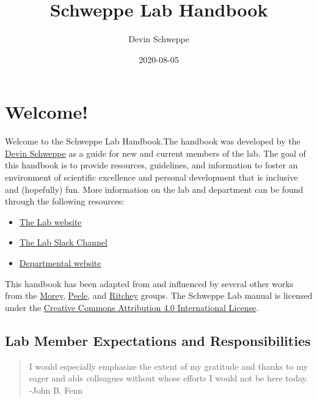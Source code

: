 \documentclass[
]{book}
\title{Schweppe Lab Handbook}
\author{Devin Schweppe}
\date{2020-08-05}
\providecommand{\tightlist}{%
  \setlength{\itemsep}{0pt}\setlength{\parskip}{0pt}}
\begin{document}
\maketitle

{
\setcounter{tocdepth}{1}
\tableofcontents
}
\hypertarget{welcome}{%
\chapter{Welcome!}\label{welcome}}

Welcome to the Schweppe Lab Handbook.The handbook was developed by the \href{https://www.schweppelab.org/}{Devin Schweppe} as a guide for new and current members of the lab. The goal of this handbook is to provide resources, guidelines, and information to foster an environment of scientific excellence and personal development that is inclusive and (hopefully) fun. More information on the lab and department can be found through the following resources:

\begin{itemize}
\tightlist
\item
  \href{https://www.schweppelab.org}{The Lab website}
\item
  \href{https://schweppelab.slack.com/}{The Lab Slack Channel}
\item
  \href{https://www.gs.washington.edu/}{Departmental website}
\end{itemize}

This handbook has been adapted from and influenced by several other works from the \href{https://ccmorey.github.io/labHandbook/index.html}{Morey}, \href{https://github.com/jpeelle/peellelab_manual/blob/master/peellelab_manual.pdf}{Peele}, and \href{http://www.thememolab.org/resources/}{Ritchey} groups. The Schweppe Lab manual is licensed under the \href{https://creativecommons.org/licenses/by/4.0/}{Creative Commons Attribution 4.0 International License}.

\hypertarget{lab-member-expectations-and-responsibilities}{%
\section{Lab Member Expectations and Responsibilities}\label{lab-member-expectations-and-responsibilities}}

\begin{quote}
I would especially emphasize the extent of my gratitude and thanks to my eager and able colleagues without whose efforts I would not be here today.
-John B. Fenn
\end{quote}
\end{document}
